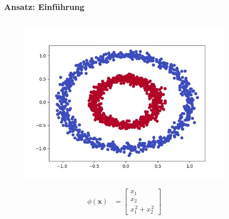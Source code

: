 	\begin{frame}
		\frametitle{Ansatz: Einführung}
			\begin{columns}
				\begin{column}{.4\textwidth}
					\begin{figure}
						\includegraphics[width=1\textwidth]{img/nonlinearsvm.png}
					\end{figure}
					\begin{align*}
						\phi(\boldsymbol{x}) &=  \begin{bmatrix}
										x_{1} \\
										x_{2} \\
										x_{1}^{\,2} + x_{2}^{\,2}
									\end{bmatrix}
					\end{align*}
				\end{column}
				\begin{column}{.6\textwidth}
				\end{column}
			\end{columns}
	\end{frame}
